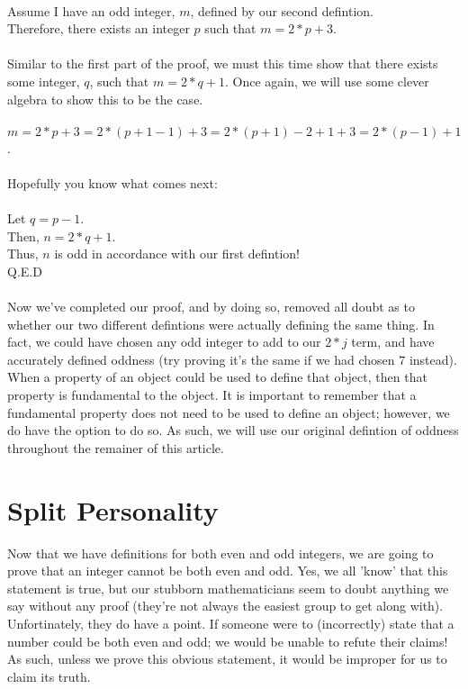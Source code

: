 \documentclass[a4paper,12pt]{article}
\begin{document}
\\
Assume I have an odd integer, $m$, defined by our second defintion.\\
Therefore, there exists an integer $p$ such that $m = 2*p + 3$.\\
\\
Similar to the first part of the proof, we must this time show that there exists some integer, $q$, such that $m = 2*q + 1$. Once again, we will use some clever algebra to show this to be the case.\\
\\
$m = 2*p + 3 = 2*(p + 1 - 1) + 3 = 2*(p + 1) - 2+1 + 3 = 2*(p - 1) + 1$.\\
\\
Hopefully you know what comes next:\\
\\
Let $q = p - 1$.\\
Then, $n = 2*q + 1$.\\
Thus, $n$ is odd in accordance with our first defintion!\\
Q.E.D\\
\\
Now we've completed our proof, and by doing so, removed all doubt as to whether our two different defintions were actually defining the same thing. In fact, we could have chosen any odd integer to add to our $2*j$ term, and have accurately defined oddness (try proving it's the same if we had chosen $7$ instead). When a property of an object could be used to define that object, then that property is fundamental to the object. It is important to remember that a fundamental property does not need to be used to define an object; however, we do have the option to do so. As such, we will use our original defintion of oddness throughout the remainer of this article.   

\section{Split Personality}
Now that we have definitions for both even and odd integers, we are going to prove that an integer cannot be both even and odd. Yes, we all 'know' that this statement is true, but our stubborn mathematicians seem to doubt anything we say without any proof (they're not always the easiest group to get along with). Unfortinately, they do have a point. If someone were to (incorrectly) state that a number could be both even and odd; we would be unable to refute their claims! As such, unless we prove this obvious statement, it would be improper for us to claim its truth.
\end{document}
